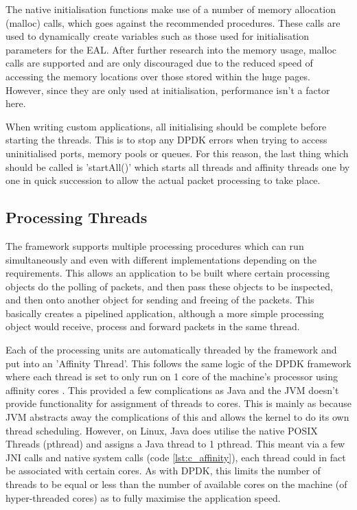 \documentclass[final_report.tex]{subfiles}
\begin{document}
The native initialisation functions make use of a number of memory allocation (malloc) calls, which goes against the recommended procedures. These calls are used to dynamically create variables such as those used for initialisation parameters for the EAL. After further research into the memory usage, malloc calls are supported and are only discouraged due to the reduced speed of accessing the memory locations over those stored within the huge pages. However, since they are only used at initialisation, performance isn't a factor here.

When writing custom applications, all initialising should be complete before starting the threads. This is to stop any DPDK errors when trying to access uninitialised ports, memory pools or queues. For this reason, the last thing which should be called is 'startAll()' which starts all threads and affinity threads one by one in quick succession to allow the actual packet processing to take place.

\newpage

\subsection{Processing Threads}
The framework supports multiple processing procedures which can run simultaneously and even with different implementations depending on the requirements. This allows an application to be built where certain processing objects do the polling of packets, and then pass these objects to be inspected, and then onto another object for sending and freeing of the packets. This basically creates a pipelined application, although a more simple processing object would receive, process and forward packets in the same thread.

Each of the processing units are automatically threaded by the framework and put into an 'Affinity Thread'. This follows the same logic of the DPDK framework where each thread is set to only run on 1 core of the machine's processor using affinity cores \cite{aff2}. This provided a few complications as Java and the JVM doesn't provide functionality for assignment of threads to cores. This is mainly as because JVM abstracts away the complications of this and allows the kernel to do its own thread scheduling. However, on Linux, Java does utilise the native POSIX Threads (pthread) and assigns a Java thread to 1 pthread. This meant via a few JNI calls and native system calls (code \ref{lst:c_affinity}), each thread could in fact be associated with certain cores. As with DPDK, this limits the number of threads to be equal or less than the number of available cores on the machine (of hyper-threaded cores) as to fully maximise the application speed.
\end{document}
